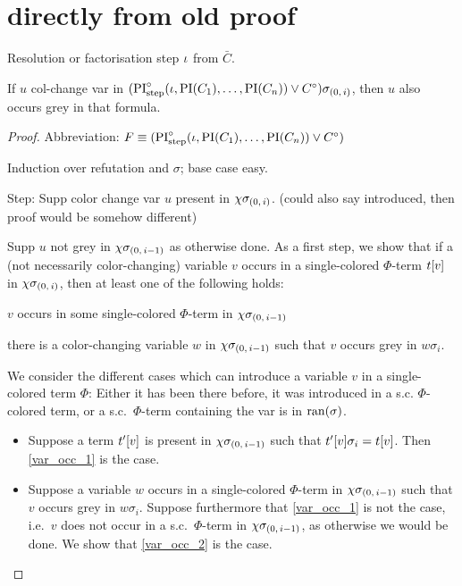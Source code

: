 \documentclass[,%
	draft=false,%
	numbers=noendperiod
	12pt,
	a4paper,
	oneside,%
	openany,
]{memoir}
\newcommand{\inv}{\ensuremath{\chi}}
\begin{document}
\section{directly from old proof}

\begin{lemma}
	\label{lemma:col_change}
	Resolution or factorisation step $\iota$ from $\bar C$.

	If $u$ col-change var in $(\operatorname{PI}^\circ_{\mathrm{step}}(\iota, \operatorname{PI}(C_1), \dots, \operatorname{PI}(C_n)) \lor C^\circ)\sigma_{(0,\,i)}$, then $u$ also occurs grey in that formula.
\end{lemma}
\begin{proof}
	Abbreviation: $F \equiv (\operatorname{PI}^\circ_{\mathrm{step}}(\iota, \operatorname{PI}(C_1), \dots, \operatorname{PI}(C_n)) \lor C^\circ)$

	Induction over refutation and $\sigma$; base case easy.

	Step:
	Supp color change var $u$ present in 
	$\inv\sigmazi$. (could also say introduced, then proof would be somehow different)

	Supp $u$ not grey in 
	$\inv\sigmazmi$ as otherwise done.
	As a first step, we show that if a (not necessarily color-changing) variable $v$ occurs in a single-colored $\Phi$-term $t[v]$ in $\inv\sigmazi$,
	then at least one of the following holds:
	\begin{compactenum}
	\item $v$ occurs in some single-colored $\Phi$-term in $\inv\sigmazmi$ \label{var_occ_1}
	\item there is a color-changing variable $w$ in $\inv\sigmazmi$ such that $v$ occurs grey in $w\sigma_i$.  \label{var_occ_2}
	\end{compactenum}
	We consider the different cases which can introduce a variable $v$ in a single-colored term $\Phi$: Either it has been there before, it was introduced in a s.c. $\Phi$-colored term, or a s.c.\ $\Phi$-term containing the var is in $\operatorname{ran}(\sigma)$.
	\begin{itemize}
		\item
			Suppose a term $t'[v]$ is present in $\inv\sigmazmi$ such that $t'[v]\sigma_i = t[v]$.
			Then \ref{var_occ_1} is the case.
		\item
			Suppose a variable $w$ occurs in a single-colored $\Phi$-term in $\inv\sigmazmi$ such that $v$ occurs grey in $w\sigma_i$.
			Suppose furthermore that \ref{var_occ_1} is not the case, i.e.\ $v$ does not occur in a s.c.\ $\Phi$-term in $\inv\sigmazmi$, as otherwise we would be done.
			We show that \ref{var_occ_2} is the case.


\end{itemize}
\end{proof}
\end{document}
